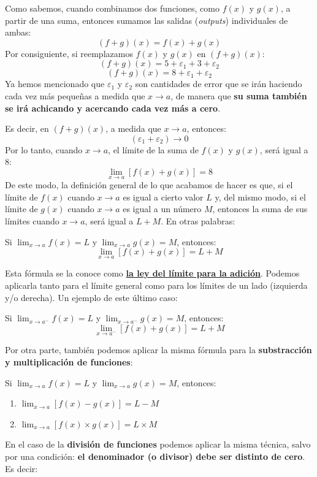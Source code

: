 \documentclass[12pt]{article}
\begin{document}
Como sabemos, cuando combinamos dos funciones, como $f(x)$ y $g(x)$, a partir de una suma, entonces sumamos las salidas (\textit{outputs}) individuales de ambas:
\[(f + g)(x) = f(x) + g(x)\]
Por consiguiente, si reemplazamos $f(x)$ y $g(x)$ en $(f + g)(x)$:
\[(f + g)(x) = 5 + \varepsilon_{1} + 3 + \varepsilon_{2}\]
\[(f + g)(x) = 8 + \varepsilon_{1} + \varepsilon_{2}\]
Ya hemos mencionado que $\varepsilon_{1}$ y $\varepsilon_{2}$ son cantidades de error que se irán haciendo cada vez más pequeñas a medida que $x \to a$, de manera que \textbf{su suma también se irá achicando y acercando cada vez más a cero}. 

Es decir, en $(f + g)(x)$, a medida que $x \to a$, entonces:
\[(\varepsilon_{1} + \varepsilon_{2}) \to 0\]
Por lo tanto, cuando $x \to a$, el límite de la suma de $f(x)$ y $g(x)$, será igual a $8$:
\[\lim_{x \to a}[f(x) + g(x)] = 8\]
De este modo, la definición general de lo que acabamos de hacer es que, si el límite de $f(x)$ cuando $x \to a$ es igual a cierto valor $L$ y, del mismo modo, si el límite de $g(x)$ cuando $x \to a$ es igual a un número $M$, entonces la suma de sus límites cuando $x \to a$, será igual a $L + M$. En otras palabras:

Si $\lim_{x \to a} f(x) = L$ y $\lim_{x \to a} g(x) = M$, entonces:
\[\lim_{x \to a} [f(x) + g(x)] = L + M\]

Esta fórmula se la conoce como \textbf{\underline{la ley del límite para la adición}}. Podemos aplicarla tanto para el límite general como para los límites de un lado (izquierda y/o derecha). Un ejemplo de este último caso:

Si $\lim_{x \to a^{-}} f(x) = L$ y $\lim_{x \to a^{-}} g(x) = M$, entonces:
\[\lim_{x \to a^{-}} [f(x) + g(x)] = L + M\] 

Por otra parte, también podemos aplicar la misma fórmula para la \textbf{substracción y multiplicación de funciones}:

Si $\lim_{x \to a} f(x) = L$ y $\lim_{x \to a} g(x) = M$, entonces:
\begin{enumerate}
\item $\lim_{x \to a} [f(x) - g(x)] = L - M$
\item $\lim_{x \to a} [f(x) \times g(x)] = L \times M$
\end{enumerate}

En el caso de la \textbf{división de funciones} podemos aplicar la misma técnica, salvo por una condición: \textbf{el denominador (o divisor) debe ser distinto de cero}. Es decir:
\end{document}
